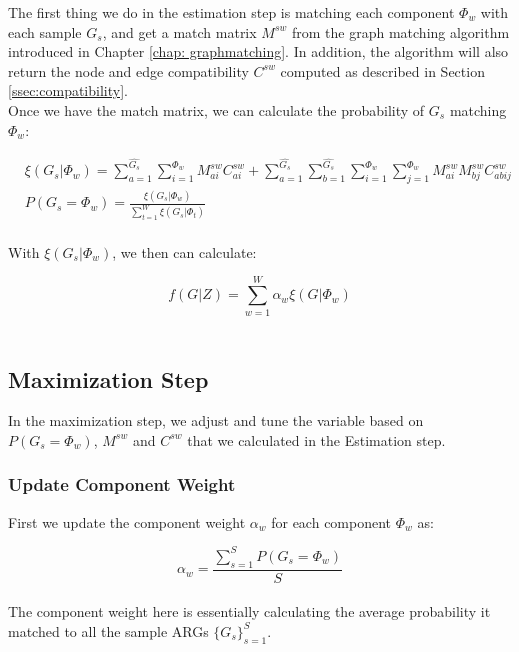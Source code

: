 The first thing we do in the estimation step is matching each component $\Phi_w$ with each sample $G_s$, and get a match matrix $M^{sw}$ from the graph matching algorithm introduced in Chapter \ref{chap: graphmatching}. In addition, the algorithm will also return the node and edge compatibility $C^{sw}$ computed as described in Section \ref{ssec:compatibility}.\\

Once we have the match matrix, we can calculate the probability of $G_s$ matching $\Phi_w$:

\begin{align} 
& \xi(G_s|\Phi_w)=\sum_{a=1}^{\widehat{G_s}}\sum_{i=1}^{\Phi_w}M^{sw}_{ai}C^{sw}_{ai}+ \sum_{a=1}^{\widehat{G_s}}\sum_{b=1}^{\widehat{G_s}}\sum_{i=1}^{\Phi_w}\sum_{j=1}^{\Phi_w}M^{sw}_{ai}M^{sw}_{bj}C^{sw}_{abij}\\
& P(G_s=\Phi_w)=\frac{\xi(G_s|\Phi_w)}{\sum_{t=1}^{W}\xi(G_s|\Phi_t)}
\end{align}\\

With $\xi(G_s|\Phi_w)$, we then can calculate:

\begin{equation} 
f(G|Z) = \sum_{w=1}^W\alpha_w\xi(G|\Phi_w) \label{eq:fgz}
\end{equation}\\

\subsection{Maximization Step}

In the maximization step, we adjust and tune the variable based on $P(G_s=\Phi_w)$, $M^{sw}$ and $C^{sw}$ that we calculated in the Estimation step.

\subsubsection{Update Component Weight}

First we update the component weight $\alpha_w$ for each component $\Phi_w$ as:

\begin{equation} 
\alpha_w=\frac{\sum^S_{s=1}P(G_s=\Phi_w)}{S}
\end{equation}\\

The component weight here is essentially calculating the average probability it matched to all the sample ARGs $\{G_s\}^S_{s=1}$.

